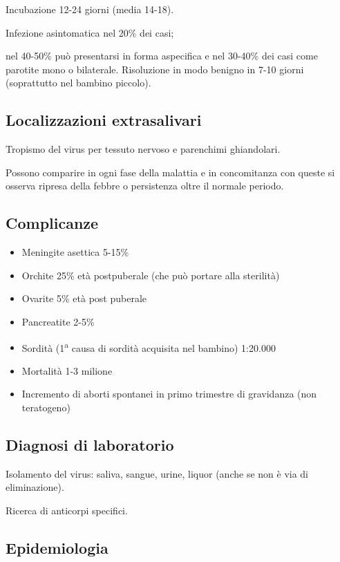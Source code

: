Incubazione 12-24 giorni (media 14-18).

Infezione asintomatica nel 20\% dei casi;

nel 40-50\% può presentarsi in forma aspecifica e nel 30-40\% dei casi
come parotite mono o bilaterale. Risoluzione in modo benigno in 7-10
giorni (soprattutto nel bambino piccolo).

\subsection{Localizzazioni extrasalivari}

Tropismo del virus per tessuto nervoso e parenchimi ghiandolari.

Possono comparire in ogni fase della malattia e in concomitanza con
queste si osserva ripresa della febbre o persistenza oltre il normale
periodo.

\subsection{Complicanze}

\begin{itemize}
\item
  Meningite asettica 5-15\%
\item
  Orchite 25\% età postpuberale (che può portare alla sterilità)
\item
  Ovarite 5\% età post puberale
\item
  Pancreatite 2-5\%
\item
  Sordità (1\textsuperscript{a} causa di sordità acquisita nel bambino)
  1:20.000
\item
  Mortalità 1-3 milione
\item
  Incremento di aborti spontanei in primo trimestre di gravidanza (non
  teratogeno)
\end{itemize}

\subsection{Diagnosi di laboratorio}

Isolamento del virus: saliva, sangue, urine, liquor (anche se non è via
di eliminazione).

Ricerca di anticorpi specifici.

\subsection{Epidemiologia}

